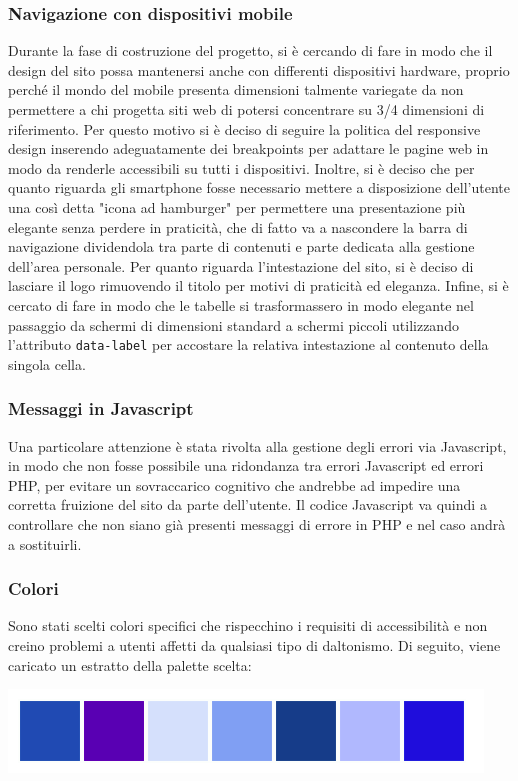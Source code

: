     \subsubsection{Navigazione con dispositivi mobile}
    Durante la fase di costruzione del progetto, si è cercando di fare in modo che il design del sito possa mantenersi anche con differenti dispositivi hardware, proprio perché il mondo del mobile presenta dimensioni talmente variegate da non permettere a chi progetta siti web di potersi concentrare su 3/4 dimensioni di riferimento. Per questo motivo si è deciso di seguire la politica del responsive design inserendo adeguatamente dei breakpoints per adattare le pagine web in modo da renderle accessibili su tutti i dispositivi. Inoltre, si è deciso che per quanto riguarda gli smartphone fosse necessario mettere a disposizione dell'utente una così detta "icona ad hamburger" per permettere una presentazione più elegante senza perdere in praticità, che di fatto va a nascondere la barra di navigazione dividendola tra parte di contenuti e parte dedicata alla gestione dell'area personale.  Per quanto riguarda l'intestazione del sito, si è deciso di lasciare il logo rimuovendo il titolo per motivi di praticità ed eleganza. Infine, si è cercato di fare in modo che le tabelle si trasformassero in modo elegante nel passaggio da schermi di dimensioni standard a schermi piccoli utilizzando l’attributo \texttt{data-label} per accostare la relativa intestazione al contenuto della singola cella.
    \subsubsection{Messaggi in Javascript}
    Una particolare attenzione è stata rivolta alla gestione degli errori via Javascript, in modo che non fosse possibile una ridondanza tra errori Javascript ed errori PHP, per evitare un sovraccarico cognitivo che andrebbe ad impedire una corretta fruizione del sito da parte dell’utente. Il codice Javascript va quindi a controllare che non siano già presenti messaggi di errore in PHP e nel caso andrà a sostituirli.
    \subsubsection{Colori}
    Sono stati scelti colori specifici che rispecchino i requisiti di accessibilità e non creino problemi a utenti affetti da qualsiasi tipo di daltonismo. Di seguito, viene caricato un estratto della palette scelta:
    \begin{center}
        \includegraphics[scale=0.8]{images/palette.png}
    \end{center}
    
